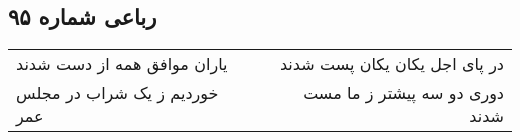 \begin{center}
\section*{رباعی شماره ۹۵}
\label{sec:sh095}
\begin{longtable}{l p{0.5cm} r}
یاران موافق همه از دست شدند
&&
در پای اجل یکان یکان پست شدند
\\
خوردیم ز یک شراب در مجلس عمر
&&
دوری دو سه پیشتر ز ما مست شدند
\\
\end{longtable}
\end{center}
